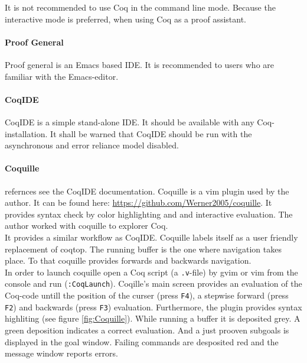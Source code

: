 It is not recommended to use Coq in the command line mode. 
Because the interactive mode is preferred, when using Coq as a proof assistant. 


\paragraph{Proof General}

Proof general is an Emacs based IDE. 
It is recommended to users who are familiar with the Emacs-editor.

\paragraph{CoqIDE}

CoqIDE is a simple stand-alone IDE. 
It should be available with any Coq-installation. 
It shall be warned that CoqIDE should be run with the asynchronous and error reliance model disabled. 

\paragraph{Coquille}

refernces see the CoqIDE documentation.
Coquille is a vim plugin used by the author.
It can be found here: \url{https://github.com/Werner2005/coquille}.
It provides syntax check by color highlighting and and interactive evaluation.  
The author worked with coquille to explorer Coq.\\
It provides a similar workflow as CoqIDE. 
Coquille labels itself as a user friendly  replacement of \gls{coqtop}. 
The running buffer is the one where navigation takes place. 
To that coquille provides forwards and backwards navigation.\\


In order to launch coquille open a Coq script (a \texttt{.v}-file) by gvim or vim from the console and run (\texttt{:CoqLaunch}). 
Coqille's main screen provides an evaluation of the Coq-code untill the position of the curser (press \texttt{F4}), a stepwise forward (press \texttt{F2}) and backwards (press \texttt{F3}) evaluation.                 
Furthermore, the plugin provides syntax highliting (see figure \ref{fig:Coquille}).
While running a buffer it is deposited grey.
A green deposition indicates a correct evaluation. 
And a just prooven subgoals is displayed in the goal window. 
Failing commands are desposited red and the message window reports errors.

